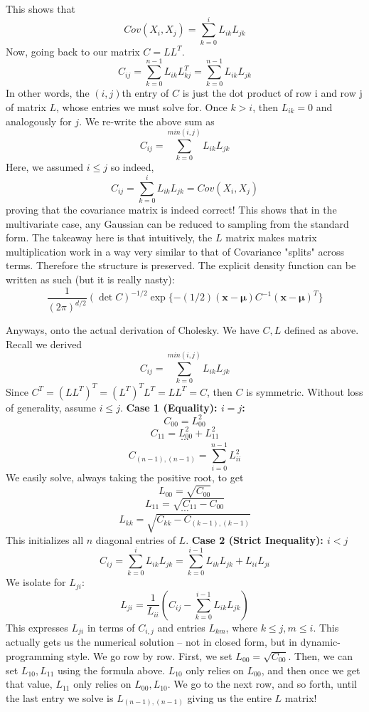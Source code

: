 \documentclass{article}
\begin{document}
This shows that $$ Cov(X_i, X_j) = \sum_{k=0}^{i}L_{ik}L_{jk}$$
Now, going back to our matrix $C = LL^T$. 
$$C_{ij}  = \sum_{k = 0}^{n-1} L_{ik} L^T_{kj} = \sum_{k = 0}^{n-1} L_{ik} L_{jk} $$ 
In other words, the $(i,j)$th entry of $C$ is just the dot product of row i and row j of matrix $L$, whose entries we must solve for. Once $k > i$, then $L_{ik} = 0$ and analogously for $j$. We re-write the above sum as 
$$  C_{ij} = \sum_{k = 0}^{min(i,j)} L_{ik} L_{jk}$$
Here, we assumed $i \leq j$ so indeed, 
$$  C_{ij} = \sum_{k = 0}^{i} L_{ik} L_{jk} = Cov(X_i, X_j)$$
proving that the covariance matrix is indeed correct! 
This shows that in the multivariate case, any Gaussian can be reduced to sampling from the standard form. \bigskip
\newline
The takeaway here is that intuitively, the $L$ matrix makes matrix multiplication work in a way very similar to that of Covariance "splits" across terms. Therefore the structure is preserved. 
The explicit density function can be written as such (but it is really nasty):
$$ \frac{1}{(2\pi)^{d/2}} (\det C)^{-1/2} \exp \{ -(1/2)(\mathbf{x}-\boldsymbol{\mu})C^{-1}(\mathbf{x}-\boldsymbol{\mu})^T \}$$

\bigskip
\noindent Anyways, onto the actual derivation of Cholesky. We have $C,L$ defined as above.  
Recall we derived 
$$  C_{ij} = \sum_{k = 0}^{min(i,j)} L_{ik} L_{jk}$$
Since $C^T = (LL^T)^T = (L^T)^TL^T = LL^T = C$, then $C$ is symmetric. Without loss of generality, assume $i \leq  j$. 
\newline
\textbf{Case 1 (Equality): $ i = j$: }
$$C_{00} = L_{00}^2$$
$$C_{11} = L_{00}^2+L_{11}^2$$
$$ \cdots $$
$$C_{(n-1),(n-1)} = \sum_{i=0}^{n-1}L_{ii}^2$$
We easily solve, always taking the positive root, to get 
$$ L_{00} = \sqrt{C_{00}}$$
$$ L_{11} = \sqrt{C_{11} - C_{00}}$$
$$ \cdots $$
$$ L_{kk} = \sqrt{C_{kk} - C_{(k-1),(k-1)}}$$
This initializes all $n$ diagonal entries of $L$. 
\newline
\textbf{Case 2 (Strict Inequality): $ i < j$ }
$$ C_{ij} = \sum_{k = 0}^{i} L_{ik} L_{jk} = \sum_{k=0}^{i-1}L_{ik} L_{jk} + L_{ii}L_{ji}$$
We isolate for $L_{ji}$:  
$$ L_{ji} = \frac{1}{L_{ii}}(C_{ij} - \sum_{k=0}^{i-1}L_{ik} L_{jk})$$
This expresses $L_{ji}$ in terms of $C_{i,j}$ and entries $L_{km}$, where $k \leq j, m \leq i$. This actually gets us the numerical solution -- not in closed form, but in dynamic-programming style. \bigskip
\newline
We go row by row. 
First, we set $L_{00} = \sqrt{C_{00}}$. Then, we can set $L_{10}, L_{11}$ using the formula above. $L_{10}$ only relies on $L_{00}$, and then once we get that value, $L_{11}$ only relies on $L_{00}, L_{10}$. We go to the next row, and so forth, until the last entry we solve is $L_{(n-1), (n-1)}$ giving us the entire $L$ matrix! 
\end{document}
